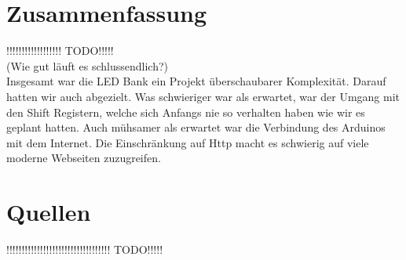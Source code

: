 \documentclass[10pt,a4paper]{article}
\begin{document}
\section{Zusammenfassung}

!!!!!!!!!!!!!!!!!! TODO!!!!!\\
(Wie gut läuft es schlussendlich?)\\

Insgesamt war die LED Bank ein Projekt überschaubarer Komplexität. Darauf hatten wir auch abgezielt. Was schwieriger war als erwartet, war der Umgang mit den Shift Registern, welche sich Anfangs nie so verhalten haben wie wir es geplant hatten. Auch mühsamer als erwartet war die Verbindung des Arduinos mit dem Internet. Die Einschränkung auf Http macht es schwierig auf viele moderne Webseiten zuzugreifen.\\

\section{Quellen}

!!!!!!!!!!!!!!!!!!!!!!!!!!!!!!!!!! TODO!!!!!\\
\end{document}
